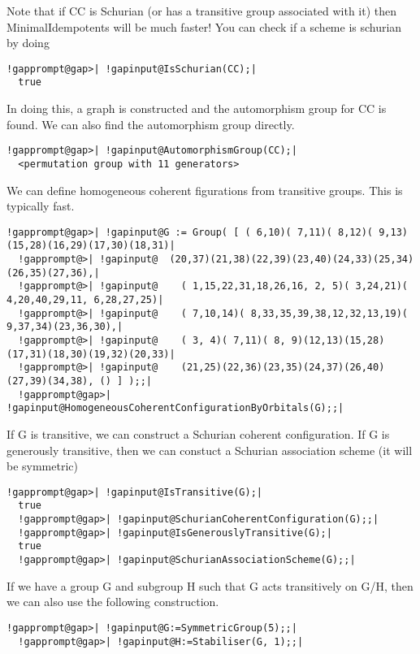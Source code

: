 \documentclass[a4paper,11pt]{report}
\begin{document}
{{ Note that if CC is Schurian (or has a transitive group associated with it)
then MinimalIdempotents will be much faster! You can check if a scheme is
schurian by doing 
\begin{Verbatim}[commandchars=!@|,fontsize=\small,frame=single,label=Example]
  !gapprompt@gap>| !gapinput@IsSchurian(CC);|
  true
\end{Verbatim}
 In doing this, a graph is constructed and the automorphism group for CC is
found. We can also find the automorphism group directly. 
\begin{Verbatim}[commandchars=!@|,fontsize=\small,frame=single,label=Example]
  !gapprompt@gap>| !gapinput@AutomorphismGroup(CC);|
  <permutation group with 11 generators>
\end{Verbatim}
 We can define homogeneous coherent figurations from transitive groups. This is
typically fast. 
\begin{Verbatim}[commandchars=!@|,fontsize=\small,frame=single,label=Example]
  !gapprompt@gap>| !gapinput@G := Group( [ ( 6,10)( 7,11)( 8,12)( 9,13)(15,28)(16,29)(17,30)(18,31)|
  !gapprompt@>| !gapinput@	(20,37)(21,38)(22,39)(23,40)(24,33)(25,34)(26,35)(27,36),|
  !gapprompt@>| !gapinput@    ( 1,15,22,31,18,26,16, 2, 5)( 3,24,21)( 4,20,40,29,11, 6,28,27,25)|
  !gapprompt@>| !gapinput@    ( 7,10,14)( 8,33,35,39,38,12,32,13,19)( 9,37,34)(23,36,30),|
  !gapprompt@>| !gapinput@    ( 3, 4)( 7,11)( 8, 9)(12,13)(15,28)(17,31)(18,30)(19,32)(20,33)|
  !gapprompt@>| !gapinput@    (21,25)(22,36)(23,35)(24,37)(26,40)(27,39)(34,38), () ] );;|
  !gapprompt@gap>| !gapinput@HomogeneousCoherentConfigurationByOrbitals(G);;|
\end{Verbatim}
 If G is transitive, we can construct a Schurian coherent configuration. If G
is generously transitive, then we can constuct a Schurian association scheme
(it will be symmetric) 
\begin{Verbatim}[commandchars=!@|,fontsize=\small,frame=single,label=Example]
  !gapprompt@gap>| !gapinput@IsTransitive(G);|
  true
  !gapprompt@gap>| !gapinput@SchurianCoherentConfiguration(G);;|
  !gapprompt@gap>| !gapinput@IsGenerouslyTransitive(G);|
  true
  !gapprompt@gap>| !gapinput@SchurianAssociationScheme(G);;|
\end{Verbatim}
 If we have a group G and subgroup H such that G acts transitively on G/H, then
we can also use the following construction. 
\begin{Verbatim}[commandchars=!@|,fontsize=\small,frame=single,label=Example]
  !gapprompt@gap>| !gapinput@G:=SymmetricGroup(5);;|
  !gapprompt@gap>| !gapinput@H:=Stabiliser(G, 1);;|

\end{Verbatim}}}
\end{document}
